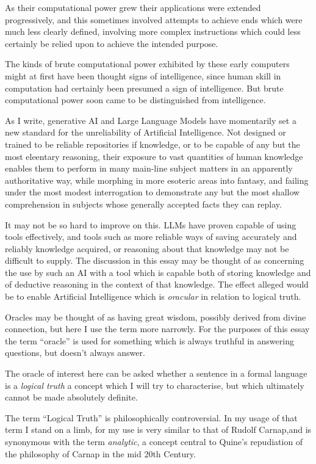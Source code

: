 \documentclass[10pt,titlepage]{book}
\begin{document}
As their computational power grew their applications were extended progressively, and this sometimes involved attempts to achieve ends which were much less clearly defined, involving more complex instructions which could less certainly be relied upon to achieve the intended purpose.

The kinds of brute computational power exhibited by these early computers might at first have been thought signs of intelligence, since human skill in computation had certainly been presumed a sign of intelligence.
But brute computational power soon came to be distinguished from intelligence.

As I write, generative AI and Large Language Models have momentarily set a new standard for the unreliability of Artificial Intelligence.
Not designed or trained to be reliable repositories if knowledge, or to be capable of any but the most eleentary reasoning, their exposure to vast quantities of human knowledge enables them to perform in many main-line subject matters in an apparently authoritative way, while morphing in more esoteric areas into fantasy, and failing under the most modest interrogation to demonstrate any but the most shallow comprehension in subjects whose generally accepted facts they can replay.

It may not be so hard to improve on this.
LLMs have proven capable of using tools effectively, and tools such as more reliable ways of saving accurately and reliably knowledge acquired, or reasoning about that knowledge may not be difficult to supply.
The discussion in this essay may be thought of as concerning the use by such an AI with a tool which is capable both of storing knowledge and of deductive reasoning in the context of that knowledge.
The effect alleged would be to enable Artificial Intelligence which is \emph{oracular} in relation to logical truth.

Oracles may be thought of as having great wisdom, possibly derived from divine connection, but here I use the term more narrowly.
For the purposes of this essay the term ``oracle'' is used for something which is always truthful in answering questions, but doesn't always answer.

The oracle of interest here can be asked whether a sentence in a formal language is a \emph{logical truth} a concept which I will try to characterise, but which ultimately cannot be made absolutely definite.

The term ``Logical Truth'' is philosophically controversial.
In my usage of that term I stand on a limb, for my use is very similar to that of Rudolf Carnap,and is synonymous with the term \emph{analytic}, a concept central to Quine's repudiation of the philosophy of Carnap in the mid 20th Century.
\end{document}
